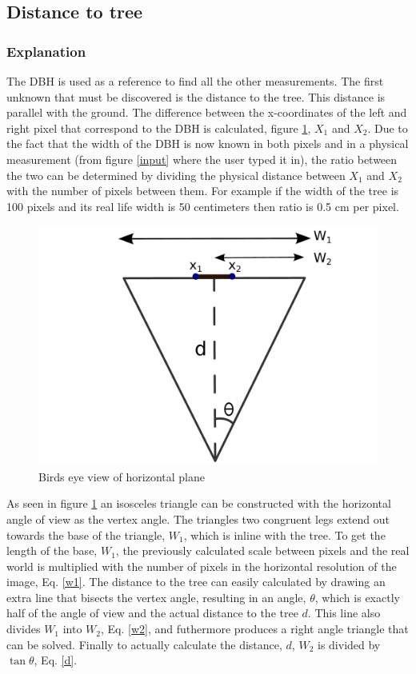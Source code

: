 \subsection{Distance to tree}
\subsubsection{Explanation}
The DBH is used as a reference to find all the other measurements. The first unknown that must be discovered is the distance to the tree. This distance is parallel with the ground. The difference between the x-coordinates of the left and right pixel that correspond to the DBH is calculated, figure \ref{horizontal_triangle}, $X_1$ and $X_2$. Due to the fact that the width of the DBH is now known in both pixels and in a physical measurement (from figure \ref{input} where the user typed it in), the ratio between the two can be determined by dividing the physical distance between $X_1$ and $X_2$ with the number of pixels between them. For example if the width of the tree is 100 pixels and its real life width is 50 centimeters then ratio is 0.5 cm per pixel.
\begin{figure}[htp]
\centering
{
	\includegraphics[scale=0.3]{horizontal_triangle.pdf}
	\caption{Birds eye view of horizontal plane}
	\label{horizontal_triangle}
}
\end{figure}
 As seen in figure \ref{horizontal_triangle} an isosceles triangle can be constructed with the horizontal angle of view as the vertex angle. The triangles two congruent legs extend out towards the base of the triangle, $W_1$, which is inline with the tree. To get the length of the base, $W_1$, the previously calculated scale between pixels and the real world is multiplied with the number of pixels in the horizontal resolution of the image, Eq. \ref{w1}. The distance to the tree can easily calculated by drawing an extra line that bisects the vertex angle, resulting in an angle, $\theta$, which is exactly half of the angle of view and the actual distance to the tree $d$. This line also divides $W_1$ into $W_2$, Eq. \ref{w2}, and futhermore produces a right angle triangle that can be solved. Finally to actually calculate the distance, $d$, $W_2$ is divided by $\tan{\theta}$, Eq. \ref{d}.
 
